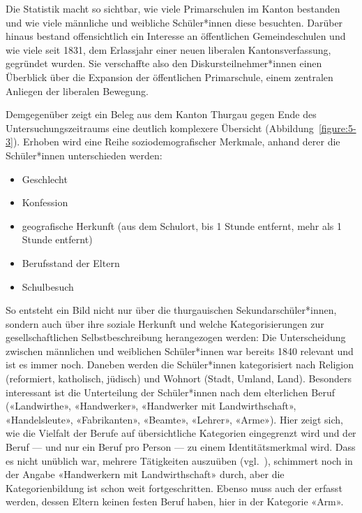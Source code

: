 Die Statistik macht so sichtbar, wie viele Primarschulen im Kanton bestanden und wie viele männliche und weibliche Schüler*innen diese besuchten. Darüber hinaus bestand offensichtlich ein Interesse an öffentlichen Gemeindeschulen und wie viele seit 1831, dem Erlassjahr einer neuen liberalen Kantonsverfassung, gegründet wurden. Sie verschaffte also den Diskursteilnehmer*innen einen Überblick über die Expansion der öffentlichen Primarschule, einem zentralen Anliegen der liberalen Bewegung.

\pagebreak

Demgegenüber zeigt ein Beleg aus dem Kanton Thurgau gegen Ende des Untersuchungszeitraums eine deutlich komplexere Übersicht (Abbildung~\ref{figure:5-3}). Erhoben wird eine Reihe soziodemografischer Merkmale, anhand derer die Schüler*innen unterschieden werden:

\begin{itemize}
    \item Geschlecht
    \item Konfession
    \item geografische Herkunft (aus dem Schulort, bis 1 Stunde entfernt, mehr als 1 Stunde entfernt)
    \item Berufsstand der Eltern
    \item Schulbesuch
\end{itemize}

So entsteht ein Bild nicht nur über die thurgauischen Sekundarschüler*innen, sondern auch über ihre soziale Herkunft und welche Kategorisierungen zur gesellschaftlichen Selbstbeschreibung herangezogen werden: Die Unterscheidung zwischen männlichen und weiblichen Schüler*innen war bereits 1840 relevant und ist es immer noch. Daneben werden die Schüler*innen kategorisiert nach Religion (reformiert, katholisch, jüdisch) und Wohnort (Stadt, Umland, Land). Besonders interessant ist die Unterteilung der Schüler*innen nach dem elterlichen Beruf («Landwirthe», «Handwerker», «Handwerker mit Landwirthschaft», «Handelsleute», «Fabrikanten», «Beamte», «Lehrer», «Arme»). Hier zeigt sich, wie die Vielfalt der Berufe auf übersichtliche Kategorien eingegrenzt wird und der Beruf --- und nur ein Beruf pro Person --- zu einem Identitätsmerkmal wird. Dass es nicht unüblich war, mehrere Tätigkeiten auszuüben (vgl.~\cite[199]{vanderstraeten_soziale_2006}), schimmert noch in der Angabe «Handwerkern mit Landwirthschaft» durch, aber die Kategorienbildung ist schon weit fortgeschritten. Ebenso muss auch der erfasst werden, dessen Eltern keinen festen Beruf haben, hier in der Kategorie «Arm».

